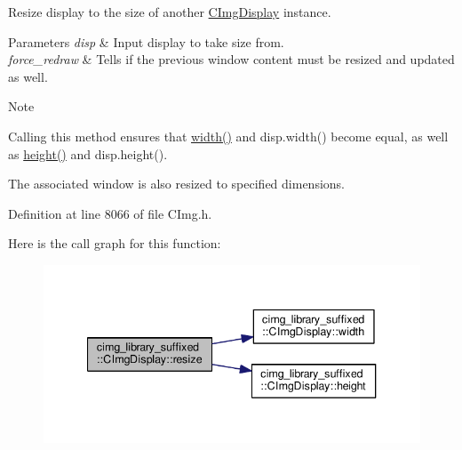 Resize display to the size of another \hyperlink{structcimg__library__suffixed_1_1CImgDisplay}{C\+Img\+Display} instance. 


\begin{DoxyParams}{Parameters}
{\em disp} & Input display to take size from. \\
\hline
{\em force\+\_\+redraw} & Tells if the previous window content must be resized and updated as well. \\
\hline
\end{DoxyParams}
\begin{DoxyNote}{Note}

\begin{DoxyItemize}
\item Calling this method ensures that \hyperlink{structcimg__library__suffixed_1_1CImgDisplay_a7b08f09ace9b615eee0ff19846c4b6f8}{width()} and {\ttfamily disp.\+width()} become equal, as well as \hyperlink{structcimg__library__suffixed_1_1CImgDisplay_a5604a6886d51d1070ed2ddc568a848f2}{height()} and {\ttfamily disp.\+height()}.
\item The associated window is also resized to specified dimensions. 
\end{DoxyItemize}
\end{DoxyNote}


Definition at line 8066 of file C\+Img.\+h.

Here is the call graph for this function\+:
\nopagebreak
\begin{figure}[H]
\begin{center}
\leavevmode
\includegraphics[width=340pt]{d5/d53/structcimg__library__suffixed_1_1CImgDisplay_a1da38da8b6517995ebd493d6bcca52ca_cgraph}
\end{center}
\end{figure}
\mbox{\label{structcimg__library__suffixed_1_1CImgDisplay_a9682e6106aaaa1b0208421de3cfe5bb4}} 
